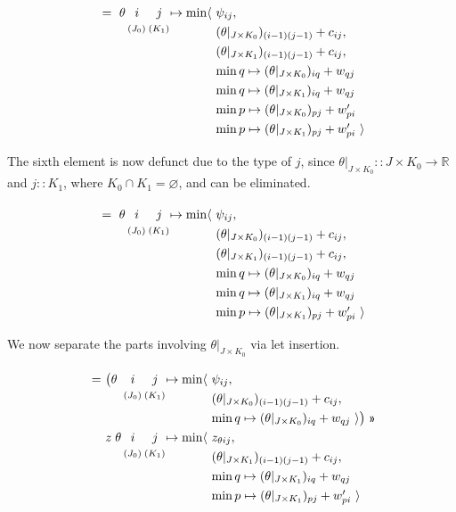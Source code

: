 \documentclass{article}
\newcommand\R{\mathbb{R}}
\begin{document}
\[\renewcommand\arraystretch{1.3}
  \begin{array}{l@{\,}c@{\,}c@{}l@{}l}
  ~=~ \theta & i & j & \mapsto\min\langle~
        & \psi_{ij}, \\
    & ^{(J_0)} & ^{(K_1)} & & (\theta|_{J\times K_0})_{(i-1)(j-1)} + c_{ij}, \\
    &          &          & & (\theta|_{J\times K_1})_{(i-1)(j-1)} + c_{ij}, \\
    &          &          & & \min q\mapsto (\theta|_{J\times K_0})_{iq} + w_{qj} \\
    &          &          & & \min q\mapsto (\theta|_{J\times K_1})_{iq} + w_{qj} \\
    &          &          & & \min p\mapsto (\theta|_{J\times K_0})_{pj} + w'_{pi} \\
    &          &          & & \min p\mapsto (\theta|_{J\times K_1})_{pj} + w'_{pi}~\rangle
\end{array}\]

The sixth element is now defunct due to the type of $j$, since $\theta|_{J\times K_0}::J\times K_0\to\R$
and $j::K_1$, where $K_0\cap K_1=\varnothing$, and can be eliminated.


\[\renewcommand\arraystretch{1.3}
  \begin{array}{l@{\,}c@{\,}c@{}l@{}l}
  ~=~ \theta & i & j & \mapsto\min\langle~
        & \psi_{ij}, \\
    & ^{(J_0)} & ^{(K_1)} & & (\theta|_{J\times K_0})_{(i-1)(j-1)} + c_{ij}, \\
    &          &          & & (\theta|_{J\times K_1})_{(i-1)(j-1)} + c_{ij}, \\
    &          &          & & \min q\mapsto (\theta|_{J\times K_0})_{iq} + w_{qj} \\
    &          &          & & \min q\mapsto (\theta|_{J\times K_1})_{iq} + w_{qj} \\
    &          &          & & \min p\mapsto (\theta|_{J\times K_1})_{pj} + w'_{pi}~\rangle
\end{array}\]

We now separate the parts involving $\theta|_{J\times K_0}$ via let insertion.

\[\renewcommand\arraystretch{1.3}
  \begin{array}{l@{}l@{\,}c@{\,}c@{}l@{}l}
  ~=~ &\big(\theta & i & j & \mapsto\min\langle~
        & \psi_{ij}, \\
    & & ^{(J_0)} & ^{(K_1)} & & (\theta|_{J\times K_0})_{(i-1)(j-1)} + c_{ij}, \\
    & &          &          & & \min q\mapsto (\theta|_{J\times K_0})_{iq} + w_{qj}~\rangle\big) ~\applt \\
    & z\;\theta& i & j & \mapsto\min\langle~
        & z_{\theta ij}, \\
    & & ^{(J_0)} & ^{(K_1)} & & (\theta|_{J\times K_1})_{(i-1)(j-1)} + c_{ij}, \\
    & &          &          & & \min q\mapsto (\theta|_{J\times K_1})_{iq} + w_{qj} \\
    & &          &          & & \min p\mapsto (\theta|_{J\times K_1})_{pj} + w'_{pi}~\rangle
\end{array}\]
\end{document}
